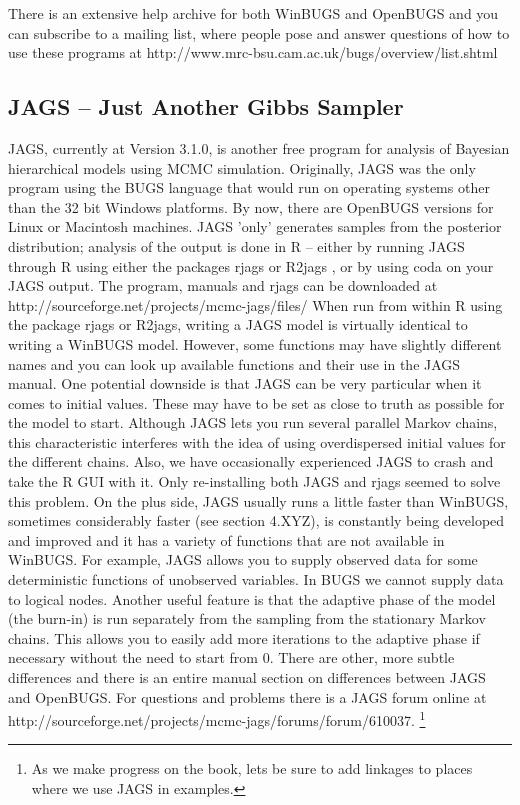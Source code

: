 There is an extensive help archive for both WinBUGS and OpenBUGS and you can subscribe to a mailing list, where people pose and answer questions of how to use these programs at http://www.mrc-bsu.cam.ac.uk/bugs/overview/list.shtml

\subsection{JAGS – Just Another Gibbs Sampler}
JAGS, currently at Version 3.1.0, is another free program for analysis of Bayesian hierarchical models using MCMC simulation. Originally, JAGS was the only program using the BUGS language that would run on operating systems other than the 32 bit Windows platforms. By now, there are OpenBUGS versions for Linux or Macintosh machines. 
JAGS 'only' generates samples from the posterior distribution; analysis of the output is done in R – either by running JAGS through R using either the packages rjags \citep{plummer:2011} or R2jags \citep{su_yajima:2011}, or by using coda on your JAGS output. The program, manuals and rjags can be downloaded at http://sourceforge.net/projects/mcmc-jags/files/
When run from within R using the package rjags or R2jags, writing a JAGS model is virtually identical to writing a WinBUGS model. However, some functions may have slightly different names and you can look up available functions and their use in the JAGS manual. One potential downside is that JAGS can be very particular when it comes to initial values. These may have to be set as close to truth as possible for the model to start. Although JAGS lets you run several parallel Markov chains, this characteristic interferes with the idea of using overdispersed initial values for the different chains. Also, we have occasionally experienced JAGS to crash and take the R GUI with it. Only re-installing both JAGS and rjags seemed to solve this problem. 
On the plus side, JAGS usually runs a little faster than WinBUGS, sometimes considerably faster (see section 4.XYZ), is constantly being developed and improved and it has a variety of functions that are not available in WinBUGS. For example, JAGS allows you to supply observed data for some deterministic functions of unobserved variables. In BUGS we cannot supply data to logical nodes. Another useful feature is that the adaptive phase of the model (the burn-in) is run separately from the sampling from the stationary Markov chains. This allows you to easily add more iterations to the adaptive phase if necessary without the need to start from 0. There are other, more subtle differences and there is an entire manual section on differences between JAGS and OpenBUGS.   
For questions and problems there is a JAGS forum online at http://sourceforge.net/projects/mcmc-jags/forums/forum/610037.
\footnote{As we make progress on the book, lets be sure  to add linkages to places where we use JAGS in examples.}

